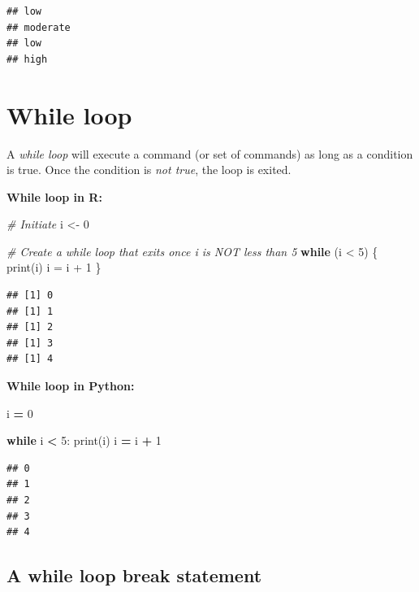 \documentclass[
]{book}
\newenvironment{Shaded}{\begin{snugshade}}{\end{snugshade}}
\newcommand{\BuiltInTok}[1]{#1}
\newcommand{\CommentTok}[1]{\textcolor[rgb]{0.56,0.35,0.01}{\textit{#1}}}
\newcommand{\ControlFlowTok}[1]{\textcolor[rgb]{0.13,0.29,0.53}{\textbf{#1}}}
\newcommand{\DecValTok}[1]{\textcolor[rgb]{0.00,0.00,0.81}{#1}}
\newcommand{\FunctionTok}[1]{\textcolor[rgb]{0.00,0.00,0.00}{#1}}
\newcommand{\NormalTok}[1]{#1}
\newcommand{\OperatorTok}[1]{\textcolor[rgb]{0.81,0.36,0.00}{\textbf{#1}}}
\newcommand{\OtherTok}[1]{\textcolor[rgb]{0.56,0.35,0.01}{#1}}
\newcommand{\SpecialCharTok}[1]{\textcolor[rgb]{0.00,0.00,0.00}{#1}}
\begin{document}
\begin{verbatim}
## low
## moderate
## low
## high
\end{verbatim}

\hypertarget{while-loop}{%
\section{While loop}\label{while-loop}}

A \emph{while loop} will execute a command (or set of commands) as long as a condition is true. Once the condition is \emph{not true}, the loop is exited.

\textbf{While loop in R:}

\begin{Shaded}
\begin{Highlighting}[]
\CommentTok{\# Initiate }
\NormalTok{i }\OtherTok{\textless{}{-}} \DecValTok{0}

\CommentTok{\# Create a while loop that exits once i is NOT less than 5}
\ControlFlowTok{while}\NormalTok{ (i }\SpecialCharTok{\textless{}} \DecValTok{5}\NormalTok{) \{}
  \FunctionTok{print}\NormalTok{(i)}
\NormalTok{  i }\OtherTok{=}\NormalTok{ i }\SpecialCharTok{+} \DecValTok{1}
\NormalTok{\}}
\end{Highlighting}
\end{Shaded}

\begin{verbatim}
## [1] 0
## [1] 1
## [1] 2
## [1] 3
## [1] 4
\end{verbatim}

\textbf{While loop in Python:}

\begin{Shaded}
\begin{Highlighting}[]
\NormalTok{i }\OperatorTok{=} \DecValTok{0}

\ControlFlowTok{while}\NormalTok{ i }\OperatorTok{\textless{}} \DecValTok{5}\NormalTok{:}
  \BuiltInTok{print}\NormalTok{(i)}
\NormalTok{  i }\OperatorTok{=}\NormalTok{ i }\OperatorTok{+} \DecValTok{1}
\end{Highlighting}
\end{Shaded}

\begin{verbatim}
## 0
## 1
## 2
## 3
## 4
\end{verbatim}

\hypertarget{a-while-loop-break-statement}{%
\subsection{A while loop break statement}\label{a-while-loop-break-statement}}
\end{document}

